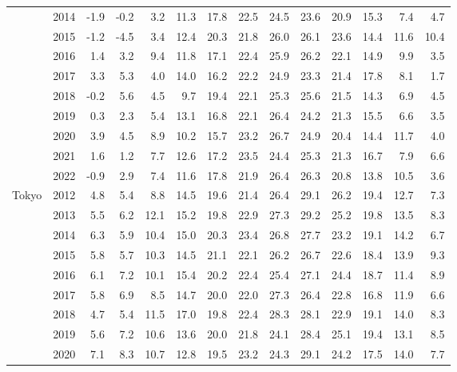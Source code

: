 \begin{table}[htbp]
\begin{adjustwidth}{-1in}{-1in}
\begin{tabular}{llrrrrrrrrrrrr}
      & 2014 & -1.9 & -0.2 &   3.2 &  11.3 &  17.8 &  22.5 &  24.5 &  23.6 &  20.9 &  15.3 &   7.4 &   4.7 \\
      & 2015 & -1.2 & -4.5 &   3.4 &  12.4 &  20.3 &  21.8 &  26.0 &  26.1 &  23.6 &  14.4 &  11.6 &  10.4 \\
      & 2016 &  1.4 &  3.2 &   9.4 &  11.8 &  17.1 &  22.4 &  25.9 &  26.2 &  22.1 &  14.9 &   9.9 &   3.5 \\
      & 2017 &  3.3 &  5.3 &   4.0 &  14.0 &  16.2 &  22.2 &  24.9 &  23.3 &  21.4 &  17.8 &   8.1 &   1.7 \\
      & 2018 & -0.2 &  5.6 &   4.5 &   9.7 &  19.4 &  22.1 &  25.3 &  25.6 &  21.5 &  14.3 &   6.9 &   4.5 \\
      & 2019 &  0.3 &  2.3 &   5.4 &  13.1 &  16.8 &  22.1 &  26.4 &  24.2 &  21.3 &  15.5 &   6.6 &   3.5 \\
      & 2020 &  3.9 &  4.5 &   8.9 &  10.2 &  15.7 &  23.2 &  26.7 &  24.9 &  20.4 &  14.4 &  11.7 &   4.0 \\
      & 2021 &  1.6 &  1.2 &   7.7 &  12.6 &  17.2 &  23.5 &  24.4 &  25.3 &  21.3 &  16.7 &   7.9 &   6.6 \\
      & 2022 & -0.9 &  2.9 &   7.4 &  11.6 &  17.8 &  21.9 &  26.4 &  26.3 &  20.8 &  13.8 &  10.5 &   3.6 \\
      \midrule
Tokyo & 2012 &  4.8 &  5.4 &   8.8 &  14.5 &  19.6 &  21.4 &  26.4 &  29.1 &  26.2 &  19.4 &  12.7 &   7.3 \\
      & 2013 &  5.5 &  6.2 &  12.1 &  15.2 &  19.8 &  22.9 &  27.3 &  29.2 &  25.2 &  19.8 &  13.5 &   8.3 \\
      & 2014 &  6.3 &  5.9 &  10.4 &  15.0 &  20.3 &  23.4 &  26.8 &  27.7 &  23.2 &  19.1 &  14.2 &   6.7 \\
      & 2015 &  5.8 &  5.7 &  10.3 &  14.5 &  21.1 &  22.1 &  26.2 &  26.7 &  22.6 &  18.4 &  13.9 &   9.3 \\
      & 2016 &  6.1 &  7.2 &  10.1 &  15.4 &  20.2 &  22.4 &  25.4 &  27.1 &  24.4 &  18.7 &  11.4 &   8.9 \\
      & 2017 &  5.8 &  6.9 &   8.5 &  14.7 &  20.0 &  22.0 &  27.3 &  26.4 &  22.8 &  16.8 &  11.9 &   6.6 \\
      & 2018 &  4.7 &  5.4 &  11.5 &  17.0 &  19.8 &  22.4 &  28.3 &  28.1 &  22.9 &  19.1 &  14.0 &   8.3 \\
      & 2019 &  5.6 &  7.2 &  10.6 &  13.6 &  20.0 &  21.8 &  24.1 &  28.4 &  25.1 &  19.4 &  13.1 &   8.5 \\
      & 2020 &  7.1 &  8.3 &  10.7 &  12.8 &  19.5 &  23.2 &  24.3 &  29.1 &  24.2 &  17.5 &  14.0 &   7.7 \\

\end{tabular}
\end{adjustwidth}
\end{table}
